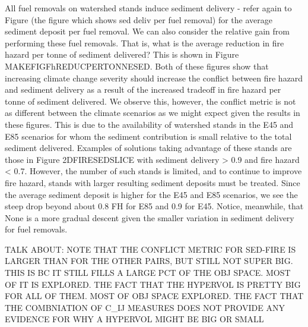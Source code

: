 All fuel removals on watershed stands induce sediment delivery - refer again to Figure (the figure which shows sed deliv per fuel removal) for the average sediment deposit per fuel removal. We can also consider the relative gain from performing these fuel removals. That is, what is the average reduction in fire hazard per tonne of sediment delivered? This is shown in Figure MAKEFIGFhREDUCPERTONNESED. Both of these figures show that increasing climate change severity should increase the conflict between fire hazard and sediment delivery as a result of the increased tradeoff in fire hazard per tonne of sediment delivered. We observe this, however, the conflict metric is not as different between the climate scenarios as we might expect given the results in these figures. This is due to the availability of watershed stands in the E45 and E85 scenarios for whom the sediment contribution is small relative to the total sediment delivered. Examples of solutions taking advantage of these stands are those in Figure 2DFIRESEDSLICE with sediment delivery > 0.9 and fire hazard < 0.7. However, the number of such stands is limited, and to continue to improve fire hazard, stands with larger resulting sediment deposits must be treated. Since the average sediment deposit is higher for the E45 and E85 scenarios, we see the steep drop beyond about 0.8 FH for E85 and 0.9 for E45. Notice, meanwhile, that None is a more gradual descent given the smaller variation in sediment delivery for fuel removals.


TALK ABOUT:
NOTE THAT THE CONFLICT METRIC FOR SED-FIRE IS LARGER THAN FOR THE OTHER PAIRS, BUT STILL NOT SUPER BIG. THIS IS BC IT STILL FILLS A LARGE PCT OF THE OBJ SPACE. MOST OF IT IS EXPLORED.
THE FACT THAT THE HYPERVOL IS PRETTY BIG FOR ALL OF THEM. MOST OF OBJ SPACE EXPLORED.
THE FACT THAT THE COMBNIATION OF C\_IJ MEASURES DOES NOT PROVIDE ANY EVIDENCE FOR WHY A HYPERVOL MIGHT BE BIG OR SMALL